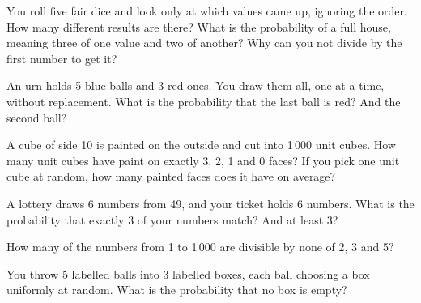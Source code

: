 \begin{question}\label{iq:iv1:counting-and-symmetry:6}
You roll five fair dice and look only at which values came up, ignoring the order. How many different results are there? What is the probability of a full house, meaning three of one value and two of another? Why can you not divide by the first number to get it?
\end{question}

\begin{question}\label{iq:iv1:counting-and-symmetry:7}
An urn holds 5 blue balls and 3 red ones. You draw them all, one at a time, without replacement. What is the probability that the last ball is red? And the second ball?
\end{question}

\begin{question}\label{iq:iv1:counting-and-symmetry:8}
A cube of side 10 is painted on the outside and cut into 1\,000 unit cubes. How many unit cubes have paint on exactly 3, 2, 1 and 0 faces? If you pick one unit cube at random, how many painted faces does it have on average?
\end{question}

\begin{question}\label{iq:iv1:counting-and-symmetry:9}
A lottery draws 6 numbers from 49, and your ticket holds 6 numbers. What is the probability that exactly 3 of your numbers match? And at least 3?
\end{question}

\begin{question}\label{iq:iv1:counting-and-symmetry:10}
How many of the numbers from 1 to 1\,000 are divisible by none of 2, 3 and 5?
\end{question}

\begin{question}\label{iq:iv1:counting-and-symmetry:11}
You throw 5 labelled balls into 3 labelled boxes, each ball choosing a box uniformly at random. What is the probability that no box is empty?
\end{question}

